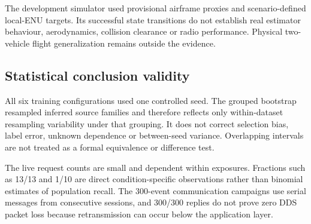 The development simulator used provisional airframe proxies and
scenario-defined local-ENU targets. Its successful state transitions do not
establish real estimator behaviour, aerodynamics, collision clearance or
radio performance. Physical two-vehicle flight generalization remains outside
the evidence.

\subsection{Statistical conclusion validity}

All six training configurations used one controlled seed. The grouped
bootstrap resampled inferred source families and therefore reflects only
within-dataset resampling variability under that grouping. It does not correct
selection bias, label error, unknown dependence or between-seed variance.
Overlapping intervals are not treated as a formal equivalence or difference
test.

The live request counts are small and dependent within exposures. Fractions
such as 13/13 and 1/10 are direct condition-specific observations rather than
binomial estimates of population recall. The 300-event communication campaigns
use serial messages from consecutive sessions, and 300/300 replies do not prove
zero DDS packet loss because retransmission can occur below the application
layer.

